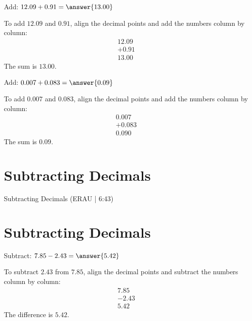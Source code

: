 \documentclass{ximera}
\begin{document}
\begin{problem}
Add: $12.09 + 0.91 = \answer{13.00}$
\begin{feedback}
To add $12.09$ and $0.91$, align the decimal points and add the numbers column by column:
\begin{align*}
  12.09 \\
+  0.91 \\
\hline
  13.00
\end{align*}
The sum is $13.00$.
\end{feedback}
\end{problem}

\begin{problem}
Add: $0.007 + 0.083 = \answer{0.09}$
\begin{feedback}
To add $0.007$ and $0.083$, align the decimal points and add the numbers column by column:
\begin{align*}
  0.007 \\
+ 0.083 \\
\hline
  0.090
\end{align*}
The sum is $0.09$.
\end{feedback}
\end{problem}


\section*{Subtracting Decimals}

Subtracting Decimals (ERAU | 6:43)



\section*{Subtracting Decimals} 

\begin{problem}
Subtract: $7.85 - 2.43 = \answer{5.42}$
\begin{feedback}
To subtract $2.43$ from $7.85$, align the decimal points and subtract the numbers column by column:
\begin{align*}
  7.85 \\
- 2.43 \\
\hline
  5.42
\end{align*}
The difference is $5.42$.
\end{feedback}
\end{problem}
\end{document}
